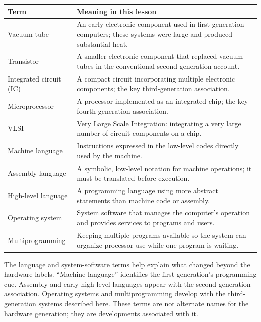 \begin{center}
\begin{tabular}{p{}p{}}
\toprule
\textbf{Term} & \textbf{Meaning in this lesson}\\
\midrule
Vacuum tube & An early electronic component used in first-generation computers; these systems were large and produced substantial heat.\\
Transistor & A smaller electronic component that replaced vacuum tubes in the conventional second-generation account.\\
Integrated circuit (IC) & A compact circuit incorporating multiple electronic components; the key third-generation association.\\
Microprocessor & A processor implemented as an integrated chip; the key fourth-generation association.\\
VLSI & Very Large Scale Integration: integrating a very large number of circuit components on a chip.\\
Machine language & Instructions expressed in the low-level codes directly used by the machine.\\
Assembly language & A symbolic, low-level notation for machine operations; it must be translated before execution.\\
High-level language & A programming language using more abstract statements than machine code or assembly.\\
Operating system & System software that manages the computer's operation and provides services to programs and users.\\
Multiprogramming & Keeping multiple programs available so the system can organize processor use while one program is waiting.\\
\bottomrule
\end{tabular}
\end{center}

The language and system-software terms help explain what changed beyond the
hardware labels. ``Machine language'' identifies the first generation's
programming cue. Assembly and early high-level languages appear with the
second-generation association. Operating systems and multiprogramming
develop with the third-generation systems described here. These terms are
not alternate names for the hardware generation; they are developments
associated with it.

